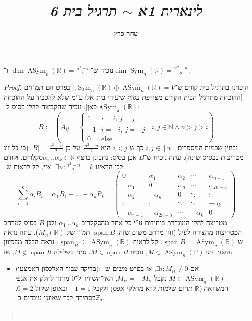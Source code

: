 \documentclass[]{article}
\author{שחר פרץ}
\title{\textit{לינארית 1א $\sim$ תרגיל בית 6}}
\newcommand\N     {\mathbb{N}}
\newcommand\Z     {\mathbb{Z}}
\newcommand\R     {\mathbb{R}}
\newcommand\other {\mathrm{else}}
\DeclareMathOperator{\Sp}     {span}
\DeclareMathOperator{\Sym}     {Sym}
\DeclareMathOperator{\Asym}    {ASym}
\newcommand\co        {\colon}
\newcommand\pms[1]    {\begin{pmatrix}
        #1
\end{pmatrix}}
\newcommand\ag        {\alpha}
\newcommand\tl    {\tilde}
\newcommand\cl [1]    {\left ( #1 \right )}
\theoremstyle{definition}
\begin{document}
    \maketitle
    
    \section{}
    נוכיח ש־$\dim \Asym_n(\R) = \frac{n^2 - n}{2}$ ו־$\dim \Sym_n(\R) = \frac{n^2 + n}{2}$. \begin{proof}
        הוכחנו בתרגיל בית קודם ש־$\Sym_n(\R) \oplus \Asym_n(\R) = V$, ובפרט הם תמ''וים [ההוכחה מתרגיל הבית הקודם מצורפת \textit{בסוף} שיעורי בית אלו ע''מ שלא להכביד על ההוכחה כאן]. נוכיח שהקבוצה להלן בסיס ל־$\Asym_n(\R)$: 
        \[ B := \cl{A_{ij} = \begin{cases}
                1 & i = \tl i, \ j = \tl j \\
                -1 & i = - \tl i,  \ j = -\tl j \\
                0 & \other
        \end{cases} \,\Bigg\vert\, i, j \in \N \land  n > j > i} \]
    נבחין שכמות המספרים $i, j \in [n]$ כך ש־$i < j$ היא $\frac{n^2 - n}{2}$. על כן $|B| = \frac{n^2 - n}{2}$ (כי כל זוג מטריצות בבסיס שונה). עתה נוכיח ש־$B$ אכן בסיס: 
        נתבונן ברצף $\ag_i \dots \ag_k \in \R$סקלרים, וקודם לכן הראינו $\exists n \co \frac{n^2 - n}{2} = k$. אזי, קל לראות ש־:
        \[ \sum_{i = 1}^{k}\ag_i B_i = \ag_1B_1 + \dots + \ag_kB_k = \pms{
               0 & \ag_1 & \ag_2 & \cdots & \ag_{n - 1} \\
               -\ag_1 & 0 &  \ag_n & \cdots & \ag_{2n - 3} \\ 
               -\ag_2 & -\ag_n & 0 & \ddots & \vdots \\ 
               \vdots & \vdots & \ddots & \ddots & -\ag_k \\ 
               -\ag_{n - 1} & -\ag_{2n - 3} & \cdots & -\ag_k & 0 
            } \]
    מטריצה להלן המוגדרת ביחידות ע''י כל אחד מהסקלרים $\ag_1 \dots \ag_k$ ולכן $B$ בסיס למרחב המטריצות מהצורה לעיל (זהו מרחב משום שזהו $\Sp B$ תמ''ו של $M_n(\R)$). עתה נראה ש־$\Sp B = \Asym_n(\R)$. קל לראות $\Sp_B \subseteq \Asym_n(\R)$. נראה הכלה מהכיוון השני. יהי $M \in \Asym_n(\R)$, נוכיח $M \in \Sp B$. נניח בשלילה $M \notin \Sp B$, אז: 
    \begin{itemize}
        \item (בדיקה עבור האלכסון האמצעי): אם $\exists i \co M_{ii} \neq 0$, אז בפרט משום ש־$M \in \Asym_n(\R)$ נקבל $M_{ii} = -M_{ii}$, האי־השוויון ל־$0$ מותר לחלק את אגפי המשוואה ($\R$ תחום שלמות ללא מחלקי אפס) ולקבל $-1 = 1$ ובאופן שקול $0 = 2$, בסתירה לכך שאיננו עובדים ב־$\Z_2$. 

\end{itemize}
\end{proof}
\end{document}
